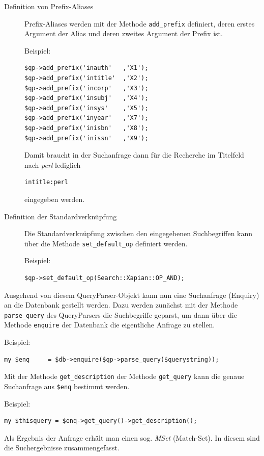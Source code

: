 \documentclass[11pt, twoside, a4paper, BCOR8mm, DIV12, bibtotoc,idxtotoc]{scrbook}
\begin{document}
\begin{description}
\item[Definition von Prefix-Aliases] Prefix-Aliases werden mit der
  Methode \texttt{add\_prefix} definiert, deren erstes Argument der
  Alias und deren zweites Argument der Prefix ist.

  Beispiel:
\begin{verbatim}
$qp->add_prefix('inauth'   ,'X1');
$qp->add_prefix('intitle'  ,'X2');
$qp->add_prefix('incorp'   ,'X3');
$qp->add_prefix('insubj'   ,'X4');
$qp->add_prefix('insys'    ,'X5');
$qp->add_prefix('inyear'   ,'X7');
$qp->add_prefix('inisbn'   ,'X8');
$qp->add_prefix('inissn'   ,'X9');
\end{verbatim}

  Damit braucht in der Suchanfrage dann für die Recherche im
  Titelfeld nach \emph{perl} lediglich
\begin{verbatim}
intitle:perl
\end{verbatim}
eingegeben werden.
\item[Definition der Standardverknüpfung] Die Standardverknüpfung
  zwischen den eingegebenen Such\-be\-griffen kann über die Methode
  \texttt{set\_default\_op} definiert werden.

  Beispiel:
\begin{verbatim}
$qp->set_default_op(Search::Xapian::OP_AND);
\end{verbatim}
\end{description}

Ausgehend von diesem QueryParser-Objekt kann nun eine Suchanfrage
(Enquiry) an die Daten\-bank gestellt werden. Dazu werden zunächst mit der
Methode \texttt{parse\_query} des QueryParsers die Suchbegriffe
geparst, um dann über die Methode \texttt{enquire} der Datenbank die
eigentliche Anfrage zu stellen.

Beispiel:
\begin{verbatim}
my $enq     = $db->enquire($qp->parse_query($querystring));
\end{verbatim}

Mit der Methode \texttt{get\_description} der Methode
\texttt{get\_query} kann die genaue Suchanfrage aus \texttt{\$enq}
bestimmt werden.

Beispiel:
\begin{verbatim}
my $thisquery = $enq->get_query()->get_description();
\end{verbatim}

Als Ergebnis der Anfrage erhält man einen sog. \emph{MSet}
(Match-Set). In diesem sind die Such\-er\-geb\-nisse zusammengefasst.
\end{document}
